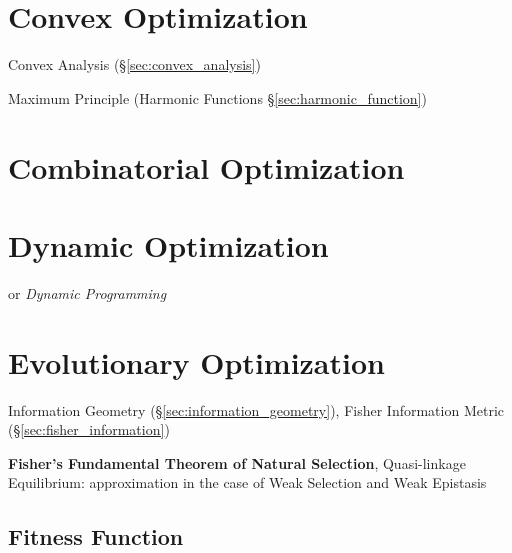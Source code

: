 \section{Convex Optimization}\label{sec:convex_optimization}

Convex Analysis (\S\ref{sec:convex_analysis})

Maximum Principle (Harmonic Functions \S\ref{sec:harmonic_function})



\section{Combinatorial Optimization}
\label{sec:combinatorial_optimization}

\section{Dynamic Optimization}\label{sec:dynamic_optimization}

or \emph{Dynamic Programming}



\section{Evolutionary Optimization}\label{sec:evolutionary_optimization}

\fist Information Geometry (\S\ref{sec:information_geometry}), Fisher
Information Metric (\S\ref{sec:fisher_information})

\fist \textbf{Fisher's Fundamental Theorem of Natural Selection},
Quasi-linkage Equilibrium: approximation in the case of Weak Selection
and Weak Epistasis %



\subsection{Fitness Function}\label{sec:fitness_function}

